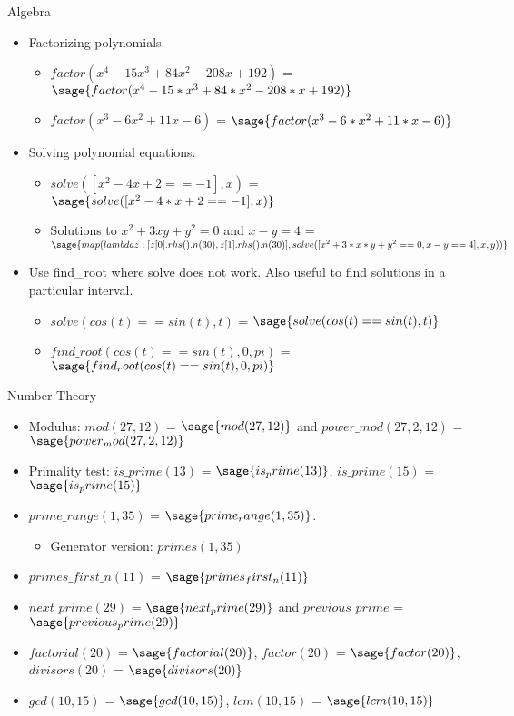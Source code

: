 \documentclass{beamer}
\begin{document}
\begin{frame}{Algebra}
  \begin{itemize}
    \item Factorizing polynomials.
    \begin{itemize}
      \item $factor(x^{4} - 15 x^{3} + 84 x^{2} - 208 x + 192)$ = $\sage{factor(x^4 - 15*x^3 + 84*x^2 - 208*x + 192)}$
      \item $factor(x^{3} - 6 x^{2} +11 x -6)$ = $\sage{factor(x^3 - 6*x^2 +11*x -6)}$
    \end{itemize}
    \item Solving polynomial equations.
    \begin{itemize}
     \item $solve([x^{2} - 4 x + 2 == -1], x)$ = $\sage{solve([x^2 - 4*x + 2 == -1], x)}$
     \item Solutions to $x^{2}+ 3 x y + y^{2} = 0$ and $x - y = 4$ = $\sage{map(lambda z: [z[0].rhs().n(30), z[1].rhs().n(30)], solve([x^2+3*x*y+y^2 == 0, x - y == 4], x, y))}$
    \end{itemize}
    \item Use find\_root where solve does not work. Also useful to find solutions in a particular interval.
    \begin{itemize}
     \item $solve(cos(t) == sin(t), t)$ = $\sage{solve(cos(t) == sin(t), t)}$
     \item $find \_ root(cos(t) == sin(t), 0, pi)$ = $\sage{find_root(cos(t) == sin(t), 0, pi)}$
    \end{itemize}
  \end{itemize}
\end{frame}

\begin{frame}{Number Theory}
 \begin{itemize}
  \item Modulus: $mod(27, 12)$ = $\sage{mod(27, 12)}$ and $power \_ mod(27, 2, 12)$ = $\sage{power_mod(27, 2, 12)}$
  \item Primality test: $is \_ prime(13)$ = $\sage{is_prime(13)}$, $is \_ prime(15)$ = $\sage{is_prime(15)}$
  \item $prime \_ range(1, 35)$ = $\sage{prime_range(1, 35)}$.
  \begin{itemize}
    \item Generator version: $primes(1, 35)$
  \end{itemize}
  \item $primes \_ first \_ n(11)$ = $\sage{primes_first_n(11)}$
  \item $next \_ prime(29)$ = $\sage{next_prime(29)}$ and $previous \_ prime$ = $\sage{previous_prime(29)}$
  \item $factorial(20)$ = $\sage{factorial(20)}$, $factor(20)$ = $\sage{factor(20)}$, $divisors(20)$  = $\sage{divisors(20)}$
  \item $gcd(10, 15)$ = $\sage{gcd(10, 15)}$, $lcm(10, 15)$ = $\sage{lcm(10, 15)}$
 \end{itemize}
\end{frame}
\end{document}
